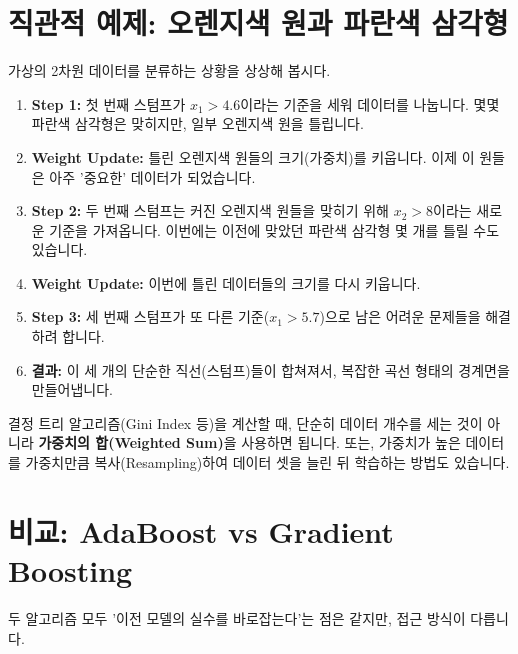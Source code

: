 \documentclass[11pt,a4paper]{book}
\theoremstyle{definition}
\begin{document}
\section{직관적 예제: 오렌지색 원과 파란색 삼각형}
가상의 2차원 데이터를 분류하는 상황을 상상해 봅시다.

\begin{enumerate}
    \item \textbf{Step 1:} 첫 번째 스텀프가 $x_1 > 4.6$이라는 기준을 세워 데이터를 나눕니다. 몇몇 파란색 삼각형은 맞히지만, 일부 오렌지색 원을 틀립니다.
    \item \textbf{Weight Update:} 틀린 오렌지색 원들의 크기(가중치)를 키웁니다. 이제 이 원들은 아주 '중요한' 데이터가 되었습니다.
    \item \textbf{Step 2:} 두 번째 스텀프는 커진 오렌지색 원들을 맞히기 위해 $x_2 > 8$이라는 새로운 기준을 가져옵니다. 이번에는 이전에 맞았던 파란색 삼각형 몇 개를 틀릴 수도 있습니다.
    \item \textbf{Weight Update:} 이번에 틀린 데이터들의 크기를 다시 키웁니다.
    \item \textbf{Step 3:} 세 번째 스텀프가 또 다른 기준($x_1 > 5.7$)으로 남은 어려운 문제들을 해결하려 합니다.
    \item \textbf{결과:} 이 세 개의 단순한 직선(스텀프)들이 합쳐져서, 복잡한 곡선 형태의 경계면을 만들어냅니다.
\end{enumerate}

\begin{tipbox}[title={팁: 스텀프는 어떻게 가중치를 반영하나요?}]
결정 트리 알고리즘(Gini Index 등)을 계산할 때, 단순히 데이터 개수를 세는 것이 아니라 \textbf{가중치의 합(Weighted Sum)}을 사용하면 됩니다. 또는, 가중치가 높은 데이터를 가중치만큼 복사(Resampling)하여 데이터 셋을 늘린 뒤 학습하는 방법도 있습니다.
\end{tipbox}

\section{비교: AdaBoost vs Gradient Boosting}

두 알고리즘 모두 '이전 모델의 실수를 바로잡는다'는 점은 같지만, 접근 방식이 다릅니다.
\end{document}

